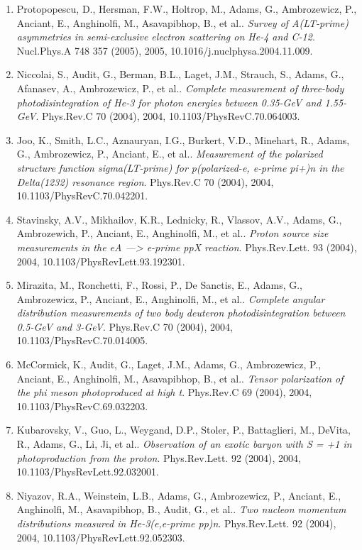 \begin{enumerate}
\item Protopopescu, D., Hersman, F.W., Holtrop, M., Adams, G., Ambrozewicz, P., Anciant, E., Anghinolfi, M., Asavapibhop, B., et al.. \textit{Survey of A(LT-prime) asymmetries in semi-exclusive electron scattering on He-4 and C-12}. Nucl.Phys.A 748 357 (2005), 2005, 10.1016/j.nuclphysa.2004.11.009.
\item Niccolai, S., Audit, G., Berman, B.L., Laget, J.M., Strauch, S., Adams, G., Afanasev, A., Ambrozewicz, P., et al.. \textit{Complete measurement of three-body photodisintegration of He-3 for photon energies between 0.35-GeV and 1.55-GeV}. Phys.Rev.C 70 (2004), 2004, 10.1103/PhysRevC.70.064003.
\item Joo, K., Smith, L.C., Aznauryan, I.G., Burkert, V.D., Minehart, R., Adams, G., Ambrozewicz, P., Anciant, E., et al.. \textit{Measurement of the polarized structure function sigma(LT-prime) for p(polarized-e, e-prime pi+)n in the Delta(1232) resonance region}. Phys.Rev.C 70 (2004), 2004, 10.1103/PhysRevC.70.042201.
\item Stavinsky, A.V., Mikhailov, K.R., Lednicky, R., Vlassov, A.V., Adams, G., Ambrozewich, P., Anciant, E., Anghinolfi, M., et al.. \textit{Proton source size measurements in the eA ---> e-prime ppX reaction}. Phys.Rev.Lett. 93 (2004), 2004, 10.1103/PhysRevLett.93.192301.
\item Mirazita, M., Ronchetti, F., Rossi, P., De Sanctis, E., Adams, G., Ambrozewicz, P., Anciant, E., Anghinolfi, M., et al.. \textit{Complete angular distribution measurements of two body deuteron photodisintegration between 0.5-GeV and 3-GeV}. Phys.Rev.C 70 (2004), 2004, 10.1103/PhysRevC.70.014005.
\item McCormick, K., Audit, G., Laget, J.M., Adams, G., Ambrozewicz, P., Anciant, E., Anghinolfi, M., Asavapibhop, B., et al.. \textit{Tensor polarization of the phi meson photoproduced at high t}. Phys.Rev.C 69 (2004), 2004, 10.1103/PhysRevC.69.032203.
\item Kubarovsky, V., Guo, L., Weygand, D.P., Stoler, P., Battaglieri, M., DeVita, R., Adams, G., Li, Ji, et al.. \textit{Observation of an exotic baryon with S = +1 in photoproduction from the proton}. Phys.Rev.Lett. 92 (2004), 2004, 10.1103/PhysRevLett.92.032001.
\item Niyazov, R.A., Weinstein, L.B., Adams, G., Ambrozewicz, P., Anciant, E., Anghinolfi, M., Asavapibhop, B., Audit, G., et al.. \textit{Two nucleon momentum distributions measured in He-3(e,e-prime pp)n}. Phys.Rev.Lett. 92 (2004), 2004, 10.1103/PhysRevLett.92.052303.

\end{enumerate}
